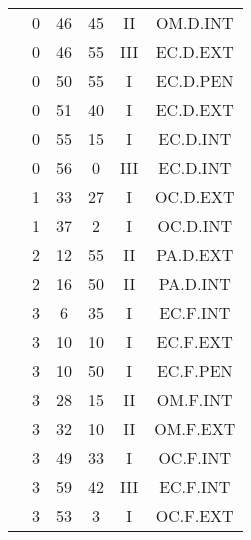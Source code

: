 \documentclass[12pt, a4paper]{article}
\begin{document}
\begin{multicols}{3}
{\begin{tabular}{c c c c c c}
	 	 	 	 & 0 & 46 & 45 & II & OM.D.INT\\%
	 	 	 	 & 0 & 46 & 55 & III & EC.D.EXT\\%
	 	 	 	 & 0 & 50 & 55 & I & EC.D.PEN\\%
	 	 	 	 & 0 & 51 & 40 & I & EC.D.EXT\\%
	 	 	 	 & 0 & 55 & 15 & I & EC.D.INT\\%
	 	 	 	 & 0 & 56 & 0 & III & EC.D.INT\\%
	 	 	 	 & 1 & 33 & 27 & I & OC.D.EXT\\%
	 	 	 	 & 1 & 37 & 2 & I & OC.D.INT\\%
	 	 	 	 & 2 & 12 & 55 & II & PA.D.EXT\\%
	 	 	 	 & 2 & 16 & 50 & II & PA.D.INT\\%
	 	 	 	 & 3 & 6 & 35 & I & EC.F.INT\\%
	 	 	 	 & 3 & 10 & 10 & I & EC.F.EXT\\%
	 	 	 	 & 3 & 10 & 50 & I & EC.F.PEN\\%
	 	 	 	 & 3 & 28 & 15 & II & OM.F.INT\\%
	 	 	 	 & 3 & 32 & 10 & II & OM.F.EXT\\%
	 	 	 	 & 3 & 49 & 33 & I & OC.F.INT\\%
	 	 	 	 & 3 & 59 & 42 & III & EC.F.INT\\%
	 	 	 	 & 3 & 53 & 3 & I & OC.F.EXT\\%
	 	 \end{tabular}
 	}
\end{multicols}
\end{document}
